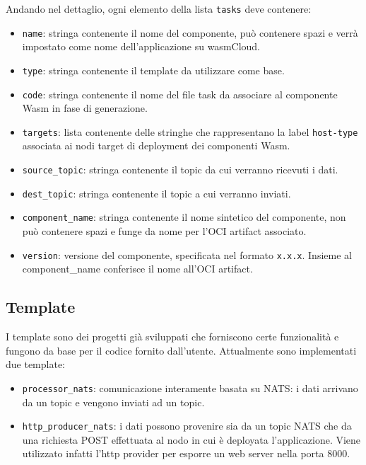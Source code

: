 Andando nel dettaglio, ogni elemento della lista \texttt{tasks} deve contenere:
\begin{itemize}
    \item \texttt{name}: stringa contenente il nome del componente, può contenere spazi e verrà impostato come nome dell'applicazione su wasmCloud.
    \item \texttt{type}: stringa contenente il template da utilizzare come base.
    \item \texttt{code}: stringa contenente il nome del file task da associare al componente Wasm in fase di generazione.
    \item \texttt{targets}: lista contenente delle stringhe che rappresentano la label \texttt{host-type} associata ai nodi target di deployment dei componenti Wasm.
    \item \texttt{source\_topic}: stringa contenente il topic da cui verranno ricevuti i dati.
    \item \texttt{dest\_topic}: stringa contenente il topic a cui verranno inviati.
    \item \texttt{component\_name}: stringa contenente il nome sintetico del componente, non può contenere spazi e funge da nome per l'OCI artifact associato.
    \item \texttt{version}: versione del componente, specificata nel formato \texttt{x.x.x}. Insieme al component\_name conferisce il nome all'OCI artifact.
    
\end{itemize}

\subsection{Template}

I template sono dei progetti già sviluppati che forniscono certe funzionalità e fungono da base per il codice fornito dall'utente. Attualmente sono implementati due template:
\begin{itemize}
    \item \texttt{processor\_nats}: comunicazione interamente basata su NATS: i dati arrivano da un topic e vengono inviati ad un topic.
    \item \texttt{http\_producer\_nats}: i dati possono provenire sia da un topic NATS che da una richiesta POST effettuata al nodo in cui è deployata l'applicazione. Viene utilizzato infatti l'http provider per esporre un web server nella porta 8000.
\end{itemize}

